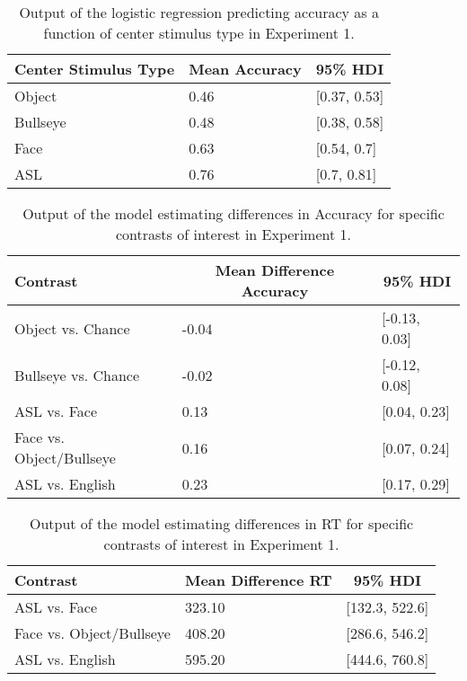 \documentclass[,man,floatsintext]{apa6}
\begin{document}
\begin{appendix}
\begin{table}[h]
\begin{center}
\begin{threeparttable}
\caption{\label{tab:trio-acc-model}Output of the logistic regression predicting accuracy as a function of center stimulus type in Experiment 1.}
\begin{tabular}{lll}
\toprule
Center Stimulus Type & \multicolumn{1}{c}{Mean Accuracy} & \multicolumn{1}{c}{95\% HDI}\\
\midrule
Object & 0.46 & [0.37, 0.53]\\
Bullseye & 0.48 & [0.38, 0.58]\\
Face & 0.63 & [0.54, 0.7]\\
ASL & 0.76 & [0.7, 0.81]\\
\bottomrule
\end{tabular}
\end{threeparttable}
\end{center}
\end{table}

\begin{table}[h]
\begin{center}
\begin{threeparttable}
\caption{\label{tab:trio-acc-contrasts}Output of the model estimating differences in Accuracy for specific contrasts of interest in Experiment 1.}
\begin{tabular}{lll}
\toprule
Contrast & \multicolumn{1}{c}{Mean Difference Accuracy} & \multicolumn{1}{c}{95\% HDI}\\
\midrule
Object vs. Chance & -0.04 & [-0.13, 0.03]\\
Bullseye vs. Chance & -0.02 & [-0.12, 0.08]\\
ASL vs. Face & 0.13 & [0.04, 0.23]\\
Face vs. Object/Bullseye & 0.16 & [0.07, 0.24]\\
ASL vs. English & 0.23 & [0.17, 0.29]\\
\bottomrule
\end{tabular}
\end{threeparttable}
\end{center}
\end{table}

\begin{table}[h]
\begin{center}
\begin{threeparttable}
\caption{\label{tab:trio-rt-contrasts}Output of the model estimating differences in RT for specific contrasts of interest in Experiment 1.}
\begin{tabular}{lll}
\toprule
Contrast & \multicolumn{1}{c}{Mean Difference RT} & \multicolumn{1}{c}{95\% HDI}\\
\midrule
ASL vs. Face & 323.10 & [132.3, 522.6]\\
Face vs. Object/Bullseye & 408.20 & [286.6, 546.2]\\
ASL vs. English & 595.20 & [444.6, 760.8]\\
\bottomrule
\end{tabular}
\end{threeparttable}
\end{center}
\end{table}


\end{appendix}
\end{document}
